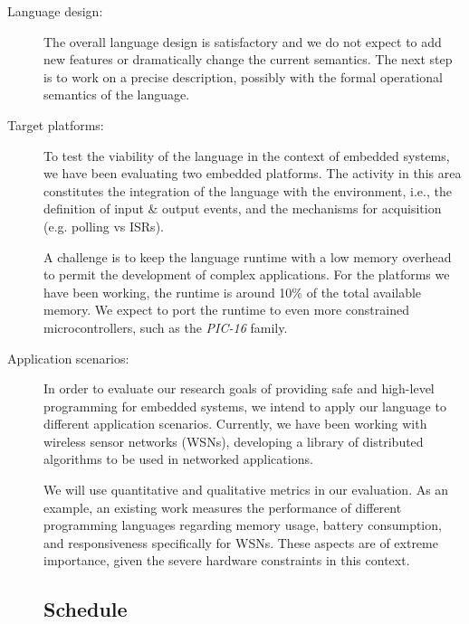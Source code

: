 \documentclass[pdftex,12pt,a4paper]{article}
\begin{document}
\begin{description}

\item[Language design:]
The overall language design is satisfactory and we do not expect to add new 
features or dramatically change the current semantics.
The next step is to work on a precise description, possibly with the formal 
operational semantics of the language.

\item[Target platforms:]
To test the viability of the language in the context of embedded systems, we 
have been evaluating two embedded platforms.
The activity in this area constitutes the integration of the language with the 
environment, i.e., the definition of input \& output events, and the mechanisms 
for acquisition (e.g. polling vs ISRs).

A challenge is to keep the language runtime with a low memory overhead to 
permit the development of complex applications.
For the platforms we have been working, the runtime is around 10\% of the total 
available memory.
We expect to port the runtime to even more constrained microcontrollers, such 
as the \emph{PIC-16} family.

\item[Application scenarios:]
In order to evaluate our research goals of providing safe and high-level 
programming for embedded systems, we intend to apply our language to different
application scenarios.
Currently, we have been working with wireless sensor networks (WSNs), 
developing a library of distributed algorithms to be used in networked 
applications.

We will use quantitative and qualitative metrics in our evaluation.
As an example, an existing work \cite{wsn.comparison} measures the performance 
of different programming languages regarding memory usage, battery consumption, 
and responsiveness specifically for WSNs.
These aspects are of extreme importance, given the severe hardware constraints 
in this context.

\subsection{Schedule}

\end{description}
\end{document}
